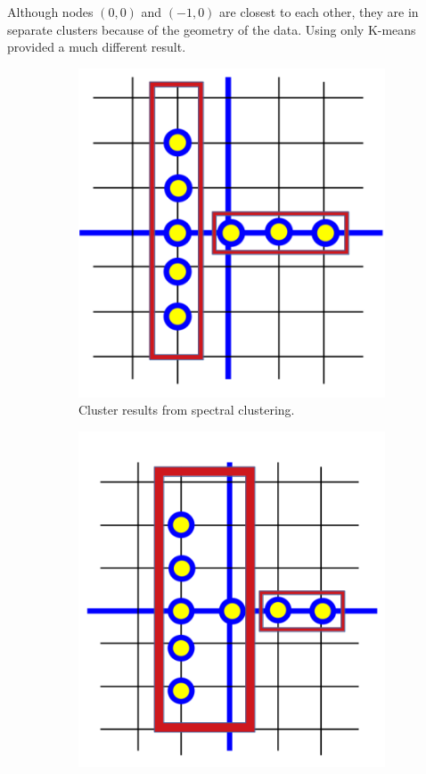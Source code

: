 \documentclass[a4paper]{article}
\begin{document}
Although nodes $(0, 0)$ and $(-1, 0)$ are closest to each other, they are in separate clusters because of the geometry of the data.  Using only K-means provided a much different result.


\begin{figure}[h]
    \centering
    \begin{subfigure}[b]{0.3\textwidth}
        \includegraphics[width=\textwidth]{Q2_spectral.png}
        \caption{Cluster results from spectral clustering.}
        \label{spectral}
    \end{subfigure}
    \begin{subfigure}[b]{0.3\textwidth}
        \includegraphics[width=\textwidth]{Q2_kmeans.png}

\end{subfigure}
\end{figure}
\end{document}
